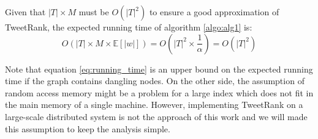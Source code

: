 Given that $|T| \times M$ must be $O(|T|^ 2)$ to ensure a good approximation of TweetRank, the expected running time of algorithm \ref{algo:alg1} is:
\begin{equation}\label{eq:running_time}
O(|T| \times M \times \mathbb{E}[|w|]) = O(|T|^2 \times \frac{1}{\alpha}) = O(|T|^2)
\end{equation}

Note that equation \ref{eq:running_time} is an upper bound on the expected running time if the graph contains dangling nodes. On the other side, the assumption of random access memory might be a problem for a large index which does not fit in the main memory of a single machine. However, implementing TweetRank on a large-scale distributed system is not the approach of this work and we will made this assumption to keep the analysis simple.